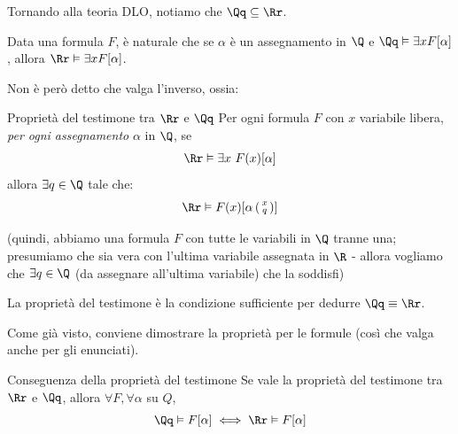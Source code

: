 \documentclass[a4paper,11pt]{report}
\newcommand{\ass}[2]{%
    \left( \begin{smallmatrix} #1 \\ #2 \end{smallmatrix} \right)
}
\begin{document}
Tornando alla teoria DLO, notiamo che \( \Qq \subseteq \Rr \).

Data una formula \( F \), è naturale che se \( \alpha \)  è un assegnamento in \( \Q \) e \( \Qq \vDash \exists x F[\alpha] \), allora \( \Rr \vDash \exists x F[\alpha] \).

Non è però detto che valga l'inverso, ossia:
\begin{thmframe}{Proprietà del testimone tra \( \Rr \) e \( \Qq \)}{}
    Per ogni formula \( F \) con \( x \) variabile libera, \textit{per ogni assegnamento} \( \alpha \) in \( \Q \), se
    \[ \Rr \vDash \exists x \ F(x)[\alpha] \]
allora \( \exists q \in \Q \) tale che:
\[ \Rr \vDash F(x)[\alpha \ass{x}{q}] \]

(quindi, abbiamo una formula \( F \) con tutte le variabili in \( \Q \) tranne una; presumiamo che sia vera con l'ultima variabile assegnata in \( \R \) - allora vogliamo che \(\exists q \in \Q \) (da assegnare all'ultima variabile) che la soddisfi)
\end{thmframe}

La proprietà del testimone è la condizione sufficiente per dedurre \( \Qq \equiv \Rr \).

Come già visto, conviene dimostrare la proprietà per le formule (così che valga anche per gli enunciati).

\begin{corframe}{Conseguenza della proprietà del testimone}{}
    Se vale la proprietà del testimone tra \( \Rr \) e \( \Qq \), allora \( \forall F, \forall \alpha \) su \( Q \),
    \[ \Qq \vDash F[\alpha] \iff \Rr \vDash F[\alpha] \]
\end{corframe}
\end{document}
